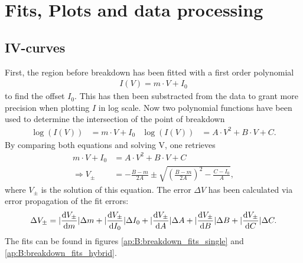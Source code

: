 \chapter{Fits, Plots and data processing}

\section{IV-curves}

First, the region before breakdown has been fitted with a first order polynomial 
\begin{align*}
I(V)=m\cdot V+I_0
\end{align*} 
to find the offset $I_0$. This has then been substracted from the data to grant more precision when plotting $I$ in log scale. Now two polynomial functions have been used to determine the intersection of the point of breakdown
\begin{align*}
\log(I(V))&=m\cdot V+I_{0} & \log(I(V))&=A\cdot V^2+B\cdot V+C.
\end{align*}
By comparing both equations and solving V, one retrieves 
\begin{align*}
m\cdot V+I_{0} &= A\cdot V^2+B\cdot V+C \\
\Rightarrow V_{\pm} &= -\frac{B-m}{2A}\pm \sqrt{\left(\frac{B-m}{2A}\right)^2-\frac{C-I_0}{A}}, 
\end{align*}
where $V_\pm$ is the solution of this equation. The error $\Delta V$ has been calculated via error propagation of the fit errors:
\begin{align*}
\Delta V_\pm=\arrowvert\dv{V_\pm}{m}\arrowvert\Delta m+\arrowvert\dv{V_\pm}{I_0}\arrowvert\Delta I_0+\arrowvert\dv{V_\pm}{A}\arrowvert\Delta A+\arrowvert\dv{V_\pm}{B}\arrowvert\Delta B+\arrowvert\dv{V_\pm}{C}\arrowvert\Delta 
C.
\end{align*}
The fits can be found in figures \ref{ap:B:breakdown_fits_single} and \ref{ap:B:breakdown_fits_hybrid}.

\newpage


